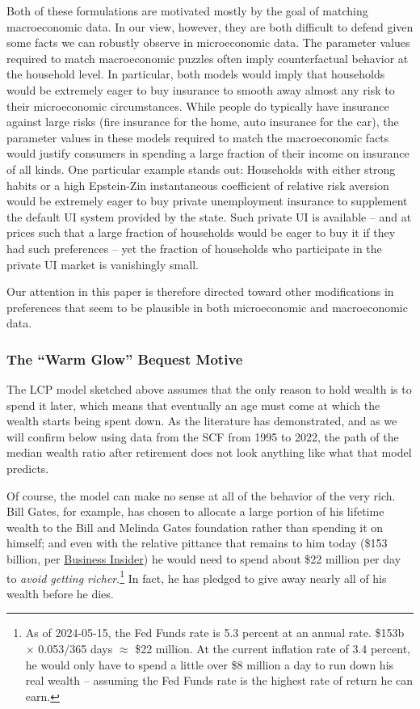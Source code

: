 \documentclass[12pt,letterpaper, fleqn]{article}
\begin{document}
Both of these formulations are motivated mostly by the goal of matching macroeconomic data.
In our view, however, they are both difficult to defend given some facts we can robustly observe in microeconomic data. The parameter values required to match macroeconomic puzzles often imply counterfactual behavior at the household level.
In particular, both models would imply that households would be extremely eager to buy insurance to smooth away almost any risk to their microeconomic circumstances.
While people do typically have insurance against large risks (fire insurance for the home, auto insurance for the car), the parameter values in these models required to match the macroeconomic facts would justify consumers in spending a large fraction of their income on insurance of all kinds.
One particular example stands out: Households with either strong habits or a high Epstein-Zin instantaneous coefficient of relative risk aversion would be extremely eager to buy private unemployment insurance to supplement the default UI system provided by the state.
Such private UI is available -- and at prices such that a large fraction of households would be eager to buy it if they had such preferences -- yet the fraction of households who participate in the private UI market is vanishingly small.

Our attention in this paper is therefore directed toward other modifications in preferences that seem to be plausible in both microeconomic and macroeconomic data.

\subsubsection{The ``Warm Glow'' Bequest Motive}

The LCP model sketched above assumes that the only reason to hold wealth is to spend it later, which means that eventually an age must come at which the wealth starts being spent down.
As the literature has demonstrated, and as we will confirm below using data from the SCF from 1995 to 2022, the path of the median wealth ratio after retirement does not look anything like what that model predicts.

Of course, the model can make no sense at all of the behavior of the very rich.
Bill Gates, for example, has chosen to allocate a large portion of his lifetime wealth to the Bill and Melinda Gates foundation rather than spending it on himself; and even with the relative pittance that remains to him today (\$153 billion, per \href{https://www.businessinsider.com/how-bill-gates-spends-fortune}{Business Insider}) he would need to spend about \$22 million per day to \textit{avoid getting richer}.\footnote{As of 2024-05-15, the Fed Funds rate is 5.3 percent at an annual rate.
\$153b $\times$ 0.053/365 days $\approx$ \$22 million.
At the current inflation rate of 3.4 percent, he would only have to spend a little over \$8 million a day to run down his real wealth -- assuming the Fed Funds rate is the highest rate of return he can earn.}
In fact, he has pledged to give away nearly all of his wealth before he dies.
\end{document}
